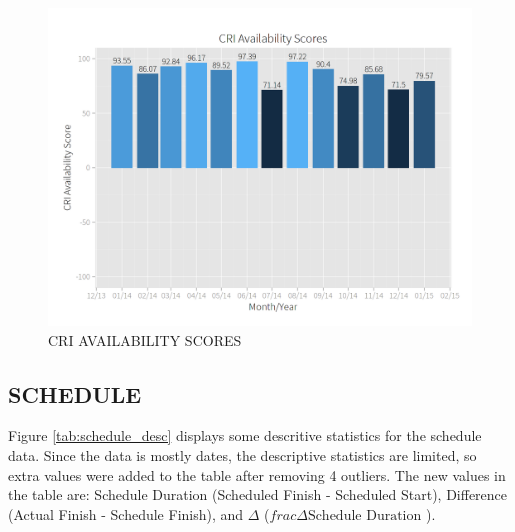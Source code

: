 \documentclass[SDSUThesis.tex]{subfiles}
\begin{document}
        \begin{figure}[ht]
            \centering
            \includegraphics[scale=.3]{images/availability_scores.png}
            \caption{CRI AVAILABILITY SCORES}
            \label{fig:availability-scores}
        \end{figure}
        
    \subsection{SCHEDULE}
        Figure \ref{tab:schedule_desc} displays some descritive statistics
        for the schedule data.  Since the data is mostly dates, the 
        descriptive statistics are limited, so extra values were
        added to the table after removing 4 outliers.  The new values
        in the table are: Schedule Duration (Scheduled Finish - Scheduled Start),
        Difference (Actual Finish - Schedule Finish), and 
        $\Delta$ ($frac{\Delta}{\text{Schedule Duration}}$ ).
    
\end{document}
